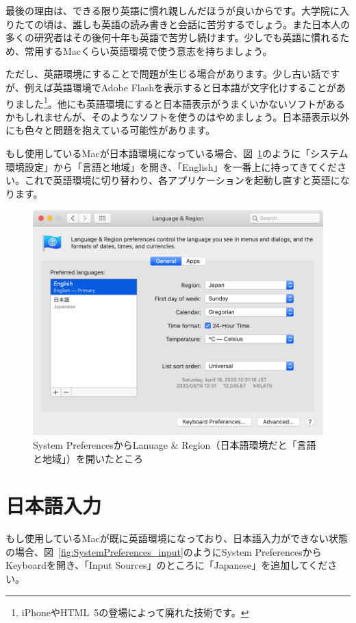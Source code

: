 最後の理由は、できる限り英語に慣れ親しんだほうが良いからです。大学院に入りたての頃は、誰しも英語の読み書きと会話に苦労するでしょう。また日本人の多くの研究者はその後何十年も英語で苦労し続けます。少しでも英語に慣れるため、常用するMacくらい英語環境で使う意志を持ちましょう。

ただし、英語環境にすることで問題が生じる場合があります。少し古い話ですが、例えば英語環境でAdobe Flashを表示すると日本語が文字化けすることがありました\footnote{iPhoneやHTML~5の登場によって廃れた技術です。}。他にも英語環境にすると日本語表示がうまくいかないソフトがあるかもしれませんが、そのようなソフトを使うのはやめましょう。日本語表示以外にも色々と問題を抱えている可能性があります。

もし使用しているMacが日本語環境になっている場合、図~\ref{fig:SystemPreferences_language}のように「システム環境設定」から「言語と地域」を開き、「English」を一番上に持ってきてください。これで英語環境に切り替わり、各アプリケーションを起動し直すと英語になります。

\begin{figure}
  \centering
  \includegraphics[scale=0.35]{fig/SystemPreferences_language.png}
  \caption{System PreferencesからLanuage \& Region（日本語環境だと「言語と地域」）を開いたところ}
  \label{fig:SystemPreferences_language}
\end{figure}

\section{日本語入力}

もし使用しているMacが既に英語環境になっており、日本語入力ができない状態の場合、図~\ref{fig:SystemPreferences_input}のようにSystem PreferencesからKeyboardを開き、「Input Sources」のところに「Japanese」を追加してください。

